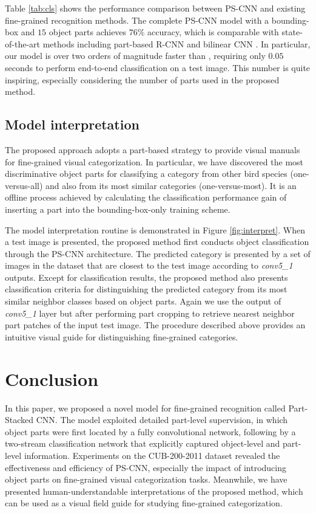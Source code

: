 \documentclass[10pt,twocolumn,letterpaper]{article}
\begin{document}
Table \ref{tab:cls} shows the performance comparison between PS-CNN and existing fine-grained recognition methods. The complete PS-CNN model with a bounding-box and $15$ object parts achieves $76\%$ accuracy, which is comparable with state-of-the-art methods including part-based R-CNN \cite{zhang2014part} and bilinear CNN \cite{lin2015bilinear}. In particular, our model is over two orders of magnitude faster than \cite{zhang2014part}, requiring only $0.05$ seconds to perform end-to-end classification on a test image. This number is quite inspiring, especially considering the number of parts used in the proposed method.




\subsection{Model interpretation}
The proposed approach adopts a part-based strategy to provide visual manuals for fine-grained visual categorization. In particular, we have discovered the most discriminative object parts for classifying a category from other bird species (one-versus-all) and also from its most similar categories (one-versus-most). It is an offline process achieved by calculating the classification performance gain of inserting a part into the bounding-box-only training scheme.

The model interpretation routine is demonstrated in Figure \ref{fig:interpret}. When a test image is presented, the proposed method first conducts object classification through the PS-CNN architecture. The predicted category is presented by a set of images in the dataset that are closest to the test image according to \textit{conv5\_1} outputs. Except for classification results, the proposed method also presents classification criteria for distinguishing the predicted category from its most similar neighbor classes based on object parts. Again we use the output of \textit{conv5\_1} layer but after performing part cropping to retrieve nearest neighbor part patches of the input test image. The procedure described above provides an intuitive visual guide for distinguishing fine-grained categories.




\section{Conclusion}\label{sec:conclusion}
In this paper, we proposed a novel model for fine-grained recognition called Part-Stacked CNN. The model exploited detailed part-level supervision, in which object parts were first located by a fully convolutional network, following by a two-stream classification network that explicitly captured object-level and part-level information. Experiments on the CUB-200-2011 dataset revealed the effectiveness and efficiency of PS-CNN, especially the impact of introducing object parts on fine-grained visual categorization tasks. Meanwhile, we have presented human-understandable interpretations of the proposed method, which can be used as a visual field guide for studying fine-grained categorization.
\end{document}
